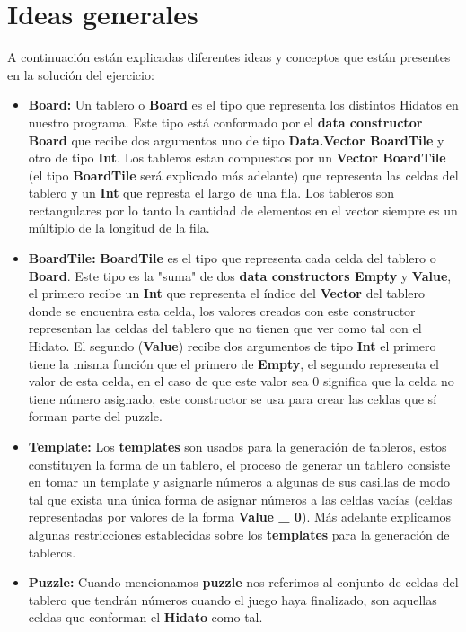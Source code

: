 \documentclass[12pt]{article}
\begin{document}
\section{Ideas generales}
A continuaci\'on est\'an explicadas diferentes ideas y conceptos que est\'an presentes
en la soluci\'on del ejercicio:
\begin{itemize}
	\item {\bf Board:}\newline
		Un tablero o {\bf Board} es el tipo que representa los distintos Hidatos en nuestro programa. Este tipo est\'a conformado
		por el {\bf data constructor Board} que recibe dos argumentos uno de tipo {\bf Data.Vector BoardTile} y otro de tipo {\bf Int}.
		Los tableros estan compuestos por un {\bf Vector BoardTile} (el tipo {\bf BoardTile} ser\'a explicado m\'as adelante) que representa
		las celdas del tablero y un {\bf Int} que represta el largo de una fila. Los tableros son rectangulares por lo tanto la cantidad de
		elementos en el vector siempre es un m\'ultiplo de la longitud de la fila.
	\item {\bf BoardTile:}\newline
		{\bf BoardTile} es el tipo que representa cada celda del tablero o {\bf Board}. Este tipo es la "suma" de dos {\bf data constructors Empty} y {\bf Value},
		el primero recibe un {\bf Int} que representa el \'indice del {\bf Vector} del tablero donde se encuentra esta celda, los valores creados con este constructor
		representan las celdas del tablero que no tienen que ver como tal con el Hidato. El segundo ({\bf Value}) recibe dos argumentos de tipo {\bf Int} el primero tiene
		la misma funci\'on que el primero de {\bf Empty}, el segundo representa el valor de esta celda, en el caso de que este valor sea 0 significa que la celda no tiene n\'umero
		asignado, este constructor se usa para crear las celdas que s\'i forman parte del puzzle.
	\item {\bf Template:}\newline
		Los {\bf templates} son usados para la generaci\'on de tableros, estos constituyen la forma de un tablero, el proceso de generar un tablero consiste en tomar un template y asignarle
		n\'umeros a algunas de sus casillas de modo tal que exista una \'unica forma de asignar n\'umeros a las celdas vac\'ias (celdas representadas por valores de la forma {\bf Value \_ 0}). M\'as adelante explicamos
		algunas restricciones establecidas sobre los {\bf templates} para la generaci\'on de tableros.
	\item {\bf Puzzle:}\newline
		Cuando mencionamos {\bf puzzle} nos referimos al conjunto de celdas del tablero que tendr\'an n\'umeros cuando el juego haya finalizado, son aquellas celdas que conforman el {\bf Hidato} como tal.	
\end{itemize}
\end{document}

